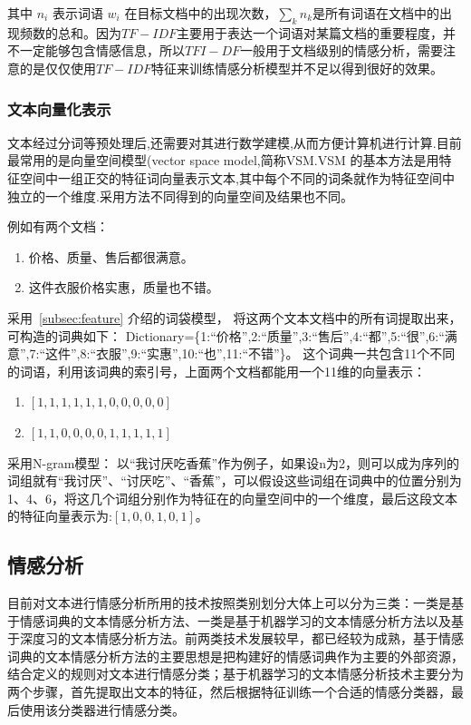 \documentclass[cs4size,a4paper]{ctexart}
\numberwithin{equation}{section}
\numberwithin{table}{section}
\numberwithin{figure}{section}
\begin{document}
其中 $n_i$ 表示词语 $w_i$ 在目标文档中的出现次数，$\sum_{k}n_k$是所有词语在文档中的出现频数的总和。因为$TF-IDF$主要用于表达一个词语对某篇文档的重要程度，并不一定能够包含情感信息，所以$TFI-DF$一般用于文档级别的情感分析，需要注意的是仅仅使用$TF-IDF$特征来训练情感分析模型并不足以得到很好的效果。

\subsubsection{文本向量化表示}

文本经过分词等预处理后,还需要对其进行数学建模,从而方便计算机进行计算.目前最常用的是向量空间模型(vector space model,简称VSM.VSM 的基本方法是用特征空间中一组正交的特征词向量表示文本,其中每个不同的词条就作为特征空间中独立的一个维度.采用方法不同得到的向量空间及结果也不同。

例如有两个文档：
\begin{enumerate}
  \item 价格、质量、售后都很满意。
  \item 这件衣服价格实惠，质量也不错。
\end{enumerate}
采用~\ref{subsec:feature} 介绍的词袋模型，
将这两个文本文档中的所有词提取出来，可构造的词典如下：
Dictionary=\{1:“价格”,2:“质量”,3:“售后”,4:“都”,5:“很”,6:“满意”,7:“这件”,8:“衣服”,9:“实惠”,10:“也”,11:“不错”\}。
这个词典一共包含11个不同的词语，利用该词典的索引号，上面两个文档都能用一个11维的向量表示：

\begin{enumerate}
  \item $\left[1, 1, 1, 1, 1, 1, 0, 0, 0, 0, 0 \right]$
  \item $\left[1, 1, 0, 0, 0, 0, 1, 1, 1, 1, 1 \right]$
\end{enumerate}

 采用N-gram模型：
 以“我讨厌吃香蕉”作为例子，如果设n为2，则可以成为序列的词组就有“我讨厌”、“讨厌吃”、“香蕉”，可以假设这些词组在词典中的位置分别为1、4、6，将这几个词组分别作为特征在的向量空间中的一个维度，最后这段文本的特征向量表示为:$\left[1, 0, 0, 1, 0, 1\right]$。

\subsection{情感分析}

目前对文本进行情感分析所用的技术按照类别划分大体上可以分为三类：一类是基于情感词典的文本情感分析方法、一类是基于机器学习的文本情感分析方法以及基于深度习的文本情感分析方法。前两类技术发展较早，都已经较为成熟，基于情感词典的文本情感分析方法的主要思想是把构建好的情感词典作为主要的外部资源，结合定义的规则对文本进行情感分类；基于机器学习的文本情感分析技术主要分为两个步骤，首先提取出文本的特征，然后根据特征训练一个合适的情感分类器，最后使用该分类器进行情感分类。
\end{document}
